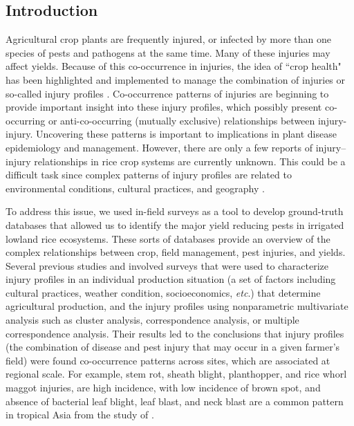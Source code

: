 \subsection{Introduction}

Agricultural crop plants are frequently injured, or infected by more than one species of pests and pathogens at the same time. Many of these injuries may affect yields. Because of this co-occurrence in injuries, the idea of ``crop health" has been highlighted and implemented to manage the combination of injuries or so-called injury profiles \citep{Savary_2006_Quantification}. Co-occurrence patterns of injuries are beginning to provide important insight into these injury profiles, which possibly present co-occurring or anti-co-occurring (mutually exclusive) relationships between injury-injury. Uncovering these patterns is important to implications in plant disease epidemiology and management. However, there are only a few reports of injury–injury relationships in rice crop systems are currently unknown. This could be a difficult task since complex patterns of injury profiles are related to environmental conditions, cultural practices, and geography \citep{Willocquet_2008_Simulating}.

To address this issue, we used in-field surveys as a tool to develop ground-truth databases that allowed us to identify the major yield reducing pests in irrigated lowland rice ecosystems. These sorts of databases provide an overview of the complex relationships between crop, field management, pest injuries, and yields. Several previous studies \cite{Savary_2000_Characterization,Savary_2000_Quantification,Dong_2010_Characterization} and \cite{Reddy_2011_Characterizing} involved surveys that were used to characterize injury profiles in an individual production situation (a set of factors including cultural practices, weather condition, socioeconomics, \textit{etc}.) that determine agricultural production, and the injury profiles using nonparametric multivariate analysis such as cluster analysis, correspondence analysis, or multiple correspondence analysis. Their results led to the conclusions that injury profiles (the combination of disease and pest injury that may occur in a given farmer’s field) were found co-occurrence patterns across sites, which are associated at regional scale. For example, stem rot, sheath blight, planthopper, and rice whorl maggot injuries, are high incidence, with low incidence of brown spot, and absence of bacterial leaf blight, leaf blast, and neck blast are a common pattern in tropical Asia from the study of \citet{Savary_2000_Characterization}.

